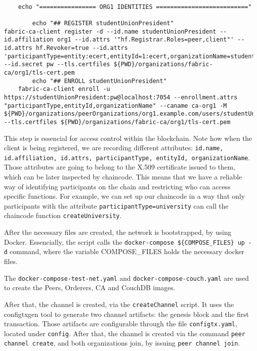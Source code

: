 \documentclass[12pt,a4paper]{article}
\theoremstyle{definition}
\begin{document}
\begin{verbatim}

    echo "================ ORG1 IDENTITIES =========================="

        echo "## REGISTER studentUnionPresident"
fabric-ca-client register -d --id.name studentUnionPresident --id.affiliation org1 --id.attrs '"hf.Registrar.Roles=peer,client"' --id.attrs hf.Revoker=true --id.attrs 'participantType=entity:ecert,entityId=1:ecert,organizationName=studentUnionTecnicoLisboa' --id.secret pw --tls.certfiles ${PWD}/organizations/fabric-ca/org1/tls-cert.pem
        echo "## ENROLL studentUnionPresident"
	fabric-ca-client enroll -u https://studentUnionPresident:pw@localhost:7054 --enrollment.attrs "participantType,entityId,organizationName" --caname ca-org1 -M ${PWD}/organizations/peerOrganizations/org1.example.com/users/studentUnionPresident@org1.example.com/msp --tls.certfiles ${PWD}/organizations/fabric-ca/org1/tls-cert.pem
\end{verbatim}

This step is essencial for access control within the blockchain. Note how when the client is being registered, we are recording different attributes: \texttt{id.name, id.affiliation, id.attrs, participantType, entityId, organizationName}. Those attributes are going to belong to the X.509 certificate issued to them, which can be later inspected by chaincode. This means that we have a reliable way of identifying participants on the chain and restricting who can access specific functions. For example, we can set up our chaincode in a way that only participants with the attribute \texttt{participantType=university} can call the chaincode function \texttt{createUniversity}.

After the necessary files are created, the network is bootstrapped, by using Docker. Essencially, the script calls the \texttt{docker-compose \$\{COMPOSE\_FILES\} up -d} command, where the variable COMPOSE\_FILES holds the necessary docker files. 

The \texttt{docker-compose-test-net.yaml} and \texttt{docker-compose-couch.yaml} are used to create the Peers, Orderers, CA and CouchDB images.

After that, the channel is created, via the \texttt{createChannel} script. It uses the configtxgen tool to generate two channel artifacts: the genesis block and the first transaction. Those artifacts are configurable through the file \texttt{configtx.yaml}, located under \texttt{config}. After that, the channel is created via the command \texttt{peer channel create}, and both organizations join, by issuing \texttt{peer channel join}. 
\end{document}
